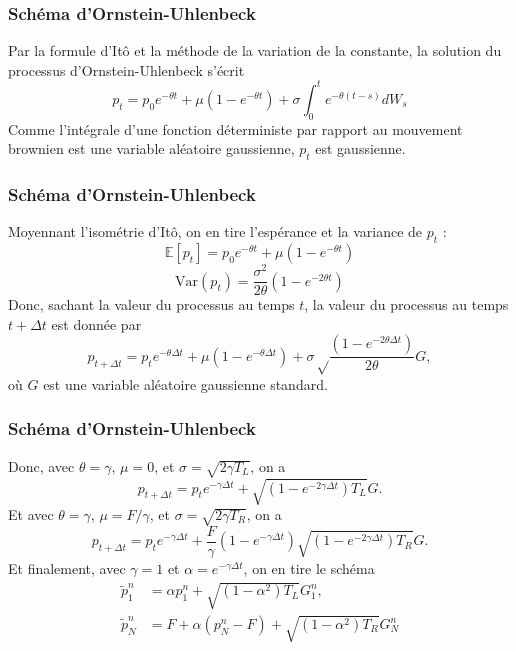 \begin{frame}

    \frametitle{Schéma d'Ornstein-Uhlenbeck}

    Par la formule d'Itô et la méthode de la variation de la constante,
    la solution du processus d'Ornstein-Uhlenbeck s'écrit
    \[p_t = p_0 e^{-\theta t} + \mu (1 - e^{-\theta t})
    + \sigma \int_0^t e^{-\theta(t-s)} dW_s\]
    Comme l'intégrale d'une fonction déterministe par rapport au mouvement
    brownien est une variable aléatoire gaussienne, $p_t$ est gaussienne.

\end{frame}



\begin{frame}

    \frametitle{Schéma d'Ornstein-Uhlenbeck}

    Moyennant l'isométrie d'Itô, on en tire l'espérance et
    la variance de $p_t$ :
    \[\mathbb{E} [p_t] = p_0 e^{-\theta t} + \mu (1 - e^{-\theta t})\]
    \[\text{Var}(p_t) = \frac{\sigma^2}{2\theta} (1 - e^{-2\theta t})\]
    Donc, sachant la valeur du processus au temps $t$, la valeur du
    processus au temps $t + \Delta t$ est donnée par
    \[p_{t+\Delta t} = p_t e^{-\theta \Delta t} + \mu (1 - e^{-\theta \Delta t})
    + \sigma \sqrt \frac{(1 - e^{-2\theta \Delta t})}{2\theta} G,\]
    où $G$ est une variable aléatoire gaussienne standard.


\end{frame}



\begin{frame}

    \frametitle{Schéma d'Ornstein-Uhlenbeck}

    Donc, avec $\theta = \gamma$, $\mu = 0$, et
    $\sigma = \sqrt{2 \gamma T_L}$, on a
    \[p_{t+\Delta t} = p_t e^{-\gamma \Delta t}
    + \sqrt{(1 - e^{-2\gamma \Delta t}) T_L} G.\]
    Et avec $\theta = \gamma$, $\mu = F / \gamma$, et
    $\sigma = \sqrt{2 \gamma T_R}$, on a
    \[p_{t+\Delta t} = p_t e^{-\gamma \Delta t}
    + \frac{F}{\gamma} (1 - e^{-\gamma \Delta t})
    \sqrt{(1 - e^{-2\gamma \Delta t}) T_R} G.\]
    Et finalement, avec $\gamma = 1$ et
    $\alpha = e^{-\gamma \Delta t}$, on en tire le schéma
    \begin{align*}
        \tilde p_1^n &= \alpha p_1^n
        + \sqrt{(1 - \alpha^2) T_L} G_1^n, \\
        \tilde p_N^n &= F + \alpha (p_N^n - F)
        + \sqrt{(1 - \alpha^2) T_R} G_N^n
    \end{align*}

\end{frame}












